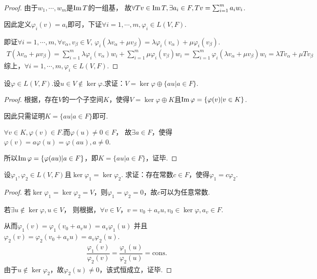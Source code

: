 \begin{proof}
    由于\(w_1,\cdots,w_m\)是\(\operatorname{Im} T\)的一组基，
    故\(\forall Tv \in \operatorname{Im} T,\exists a_i \in F,Tv=\sum_{i=1}^m a_iw_i\).
    
    因此定义\(\varphi_i(v)=a_i\)即可，下证\(\forall i=1,\cdots,m,\varphi_i \in L(V,F)\).
    
    即证\(\forall i=1,\cdots,m,\forall v_\alpha,v_\beta \in V\),
    \(\varphi_i(\lambda v_\alpha+\mu v_\beta)=\lambda \varphi_i(v_\alpha)+\mu \varphi_i(v_\beta)\).
    \begin{align*}
        T(\lambda v_\alpha+\mu v_\beta)=\sum_{i=1}^m \lambda \varphi_i(v_\alpha)w_i+\sum_{i=1}^m \mu \varphi_i(v_\beta)w_i
        =\sum_{i=1}^m \varphi_i(\lambda v_\alpha+\mu v_\beta)w_i=\lambda Tv_\alpha+\mu Tv_\beta
    \end{align*}
    综上，\(\forall i=1,\cdots,m,\varphi_i \in L(V,F)\).    
\end{proof}

\begin{problem}[29]\label{3.B.29}
    设\(\varphi \in L(V,F)\).设\(u \in V \notin \ker \varphi\).求证：\(V=\ker \varphi \oplus \{au|a \in F\}\).
\end{problem}

\begin{proof}
    根据，存在\(V\)的一个子空间\(K\)，使得\(V=\ker \varphi \oplus K\)且\(\operatorname{Im} \varphi=\{\varphi (v)|v \in K\}\).
    
    因此只需证明\(K=\{au|a \in F\}\)即可.
    
    \(\forall v \in K,\varphi(v) \in F\).而\(\varphi(u) \ne 0 \in F\)，
    故\(\exists a \in F\)，使得\(\varphi(v)=a \varphi(u)=\varphi(au),a \ne 0\).

    所以\(\operatorname{Im} \varphi=\{\varphi (au)|a \in F\}\)，即\(K=\{au|a \in F\}\)，证毕.    
\end{proof}

\begin{problem}[30]\label{3.B.30}
    设\(\varphi_1,\varphi_2 \in L(V,F)\)且\(\ker \varphi_1=\ker \varphi_2\).
    求证：存在常数\(c \in F\)，使得\(\varphi_1=c \varphi_2\).    
\end{problem}

\begin{proof}
    若\(\ker \varphi_1=\ker \varphi_2=V\)，则\(\varphi_1=\varphi_2=0\)，故\(c\)可以为任意常数.

    若\(\exists u \notin \ker \varphi,u \in V\)，
    则根据，\(\forall v \in V\)，\(v=v_0+a_vu,v_0 \in \ker \varphi,a_v \in F\).
    
    从而\(\varphi_1(v)=\varphi_1(v_0+a_vu)=a_v \varphi_1(u)\)
    并且\(\varphi_2(v)=\varphi_2(v_0+a_vu)=a_v \varphi_2(u)\).
    \begin{align*}
        \dfrac{\varphi_1(v)}{\varphi_2(v)}=\dfrac{\varphi_1(u)}{\varphi_2(u)}=\mathrm{cons.}
    \end{align*}
    由于\(u \notin \ker \varphi_2\)，故\(\varphi_2(u) \ne 0\)，该式恒成立，证毕.    
\end{proof}


